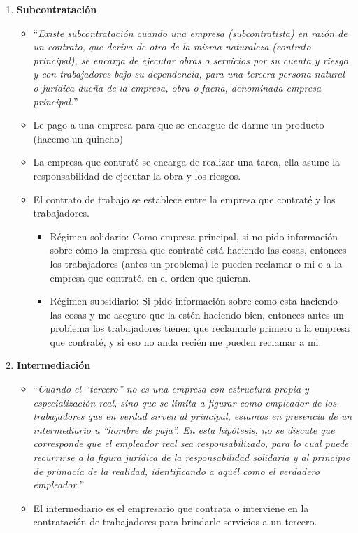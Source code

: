 \documentclass[spanish,12pt,a4paper,titlepage]{report}
\begin{document}
\begin{enumerate}
\item \textbf{Subcontratación}
  \begin{itemize}
  \item ``\textit{Existe subcontratación cuando una empresa (subcontratista) en razón de un contrato, que deriva de otro de la misma naturaleza (contrato principal), se encarga de ejecutar obras o servicios por su cuenta y riesgo y con trabajadores bajo su dependencia, para una tercera persona natural o jurídica dueña de la empresa, obra o faena, denominada empresa principal.}''
  \item Le pago a una empresa para que se encargue de darme un producto (haceme un quincho)
  \item La empresa que contraté se encarga de realizar una tarea, ella asume la responsabilidad de ejecutar la obra y los riesgos.
  \item El contrato de trabajo se establece entre la empresa que contraté y los trabajadores.
    \begin{itemize}
    \item Régimen solidario: Como empresa principal, si no pido información sobre cómo la empresa que contraté está haciendo las cosas, entonces los trabajadores (antes un problema) le pueden reclamar o mi o a la empresa que contraté, en el orden que quieran.
    \item Régimen subsidiario: Si pido información sobre como esta haciendo las cosas y me aseguro que la estén haciendo bien, entonces antes un problema los trabajadores tienen que reclamarle primero a la empresa que contraté, y si eso no anda recién me pueden reclamar a mi.
    \end{itemize}
  \end{itemize}
\item \textbf{Intermediación}
  \begin{itemize}
\item ``\textit{Cuando el “tercero” no es una empresa con estructura propia y especialización real, sino que se limita a figurar como empleador de los trabajadores que en verdad sirven al principal, estamos en presencia de un intermediario u “hombre de paja”. En esta hipótesis, no se discute que corresponde que el empleador real sea responsabilizado, para lo cual puede recurrirse a la figura jurídica de la responsabilidad solidaria y al principio de primacía de la realidad, identificando a aquél como el verdadero empleador.}''
  \item El intermediario es el empresario que contrata o interviene en la contratación de trabajadores para brindarle servicios a un tercero.

\end{itemize}
\end{enumerate}
\end{document}
